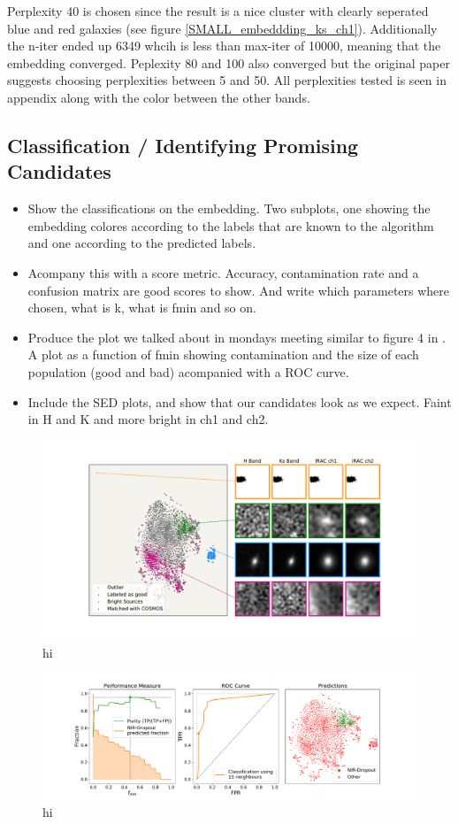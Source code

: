 Perplexity 40 is chosen since the result is a nice cluster with clearly seperated blue and red galaxies (see figure \ref{SMALL_embeddding_ks_ch1}). Additionally the n-iter ended up 6349 whcih is less than max-iter of 10000, meaning that the embedding converged. Peplexity 80 and 100 also converged but the original paper \cite{Maaten_2008_tSNE} suggests choosing perplexities between 5 and 50. All perplexities tested is seen in appendix along with the color between the other bands.

\subsection{Classification / Identifying Promising Candidates}
\begin{itemize}
    \item Show the classifications on the embedding. Two subplots, one showing the embedding colores according to the labels that are known to the algorithm and one according to the predicted labels.
    \item Acompany this with a score metric. Accuracy, contamination rate and a confusion matrix are good scores to show. And write which parameters where chosen, what is k, what is fmin and so on.
    \item Produce the plot we talked about in mondays meeting similar to figure 4 in \cite{Steinhardt_2020}. A plot as a function of fmin showing contamination and the size of each population (good and bad) acompanied with a ROC curve.
    \item Include the SED plots, and show that our candidates look as we expect. Faint in H and K and more bright in ch1 and ch2.
\end{itemize}

\begin{figure}[h!]
    \centering %
    \includegraphics[trim={0cm 0cm 0cm 0cm},clip,width=\textwidth]{Code/Saved_Figures/Visual_inspection_embedding.pdf}
    \caption{hi}
    \label{embedding_regions}
\end{figure}

\begin{figure}[h!]
    \centering %
    \includegraphics[trim={3.5cm 0cm 4.5cm 0cm},clip,width=\textwidth]{Code/Saved_Figures/Classification_plot.pdf}
    \caption{hi}
    \label{classification_plot}
\end{figure}